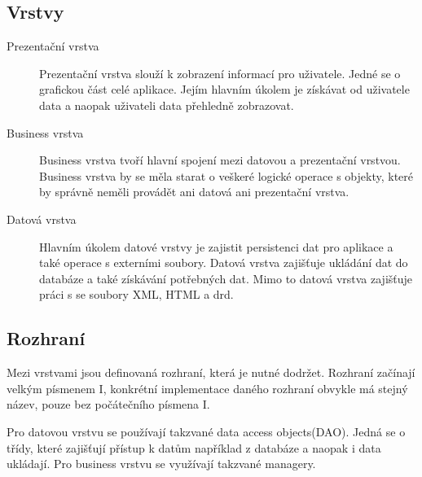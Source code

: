 \documentclass[thesis=B,czech]{resources/FITthesis}[2012/06/26]
\begin{document}
\subsection{Vrstvy}
\begin{description}
	\item[Prezentační vrstva] Prezentační vrstva slouží k zobrazení informací pro uživatele. Jedné se o grafickou část celé aplikace. Jejím hlavním úkolem je získávat od uživatele data a naopak uživateli data přehledně zobrazovat. 
	
	\item[Business vrstva] Business vrstva tvoří hlavní spojení mezi datovou a prezentační vrstvou. Business vrstva by se měla starat o veškeré logické operace s objekty, které by správně neměli provádět ani datová ani prezentační vrstva.
	
	\item[Datová vrstva] Hlavním úkolem datové vrstvy je zajistit persistenci dat pro aplikace a také operace s externími soubory. Datová vrstva zajišťuje ukládání dat do databáze a také získávání potřebných dat. Mimo to datová vrstva zajišťuje práci s se soubory XML, HTML a drd. 
	
\end{description}



\subsection{Rozhraní}
Mezi vrstvami jsou definovaná rozhraní, která je nutné dodržet. Rozhraní začínají velkým písmenem I, konkrétní implementace daného rozhraní obvykle má stejný název, pouze bez počátečního písmena I.\par

Pro datovou vrstvu se používají takzvané \clqq data access objects\crqq (DAO). Jedná se o třídy, které zajišťují přístup k datům například z databáze a naopak i data ukládají. Pro business vrstvu se využívají takzvané \clqq managery\crqq .
\end{document}
